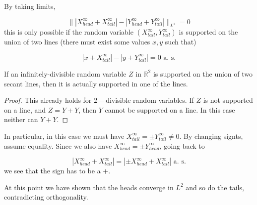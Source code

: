 \documentclass{inprogress}
\begin{document}
By taking limits,

$$
\||X^\infty_{head}+X^\infty_{tail}|-|Y^\infty_{head}+Y^\infty_{tail}|\|_{L^{1}} = 0
$$
this is only possible if the random variable $(X^\infty_{tail}, Y^\infty_{tail})$ is supported on the union of two lines (there must exist some values $x,y$ such that)

$$
|x+X^\infty_{tail}|-|y+Y^\infty_{tail}| = 0 \text{ a. s.}
$$
\begin{lemma}
    If an infinitely-divisible random variable $Z$ in $\mathbb R^2$ is supported on the  union of two secant lines, then it is actually supported in one of the lines. 
\end{lemma}
\begin{proof}
    This already holds for $2-$divisible random variables. If $Z$ is not supported on a line, and $Z  = Y + Y$, then $Y$ cannot be supported on a line. In this case neither can $Y+Y$.
\end{proof}

In particular, in this case we must have $X^{\infty}_{tail} = \pm Y^{\infty}_{tail} \neq 0$. By changing signts, assume equality. Since we also have $X^\infty_{head} = \pm Y^\infty_{head}$, going back to 

$$
|X^\infty_{head}+X^\infty_{tail}| = |\pm X^\infty_{head}+X^\infty_{tail}| \text{ a. s.}
$$
we see that the sign has to be a $+$. 

At this point we have shown that the heads converge in $L^2$ and so do the tails, contradicting orthogonality.
\end{document}
